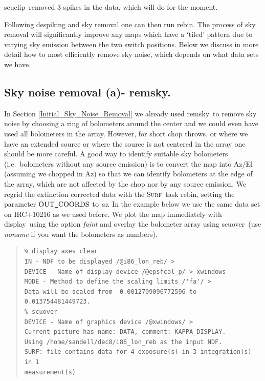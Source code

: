 \documentclass[twoside,11pt]{article}
\newenvironment{myquote}{\begin{quote}\begin{small}}{\end{small}\end{quote}}
\newcommand{\surf}{\xref{\textsc{Surf}}{sun216}{}}
\newcommand{\task}[1]{\textsf{#1}}
\newcommand{\rebin}{\xref{\task{rebin}}{sun216}{REBIN}}
\newcommand{\remsky}{\xref{\task{remsky}}{sun216}{REMSKY}}
\newcommand{\scuover}{\xref{\task{scuover}}{sun216}{SCUOVER}}
\newcommand{\scuclip}{\xref{\task{scuclip}}{sun216}{SCUCLIP}}
\newcommand{\display}{\xref{\task{display}}{sun95}{DISPLAY}}
\newcommand{\xref}[3]{#1}
\newcommand{\xlabel}[1]{}
\renewcommand{\_}{\texttt{\symbol{95}}}
\begin{document}
\scuclip\ removed 3 spikes in the data, which will do for the moment.



Following despiking and sky removal one can then run \rebin.  The
process of sky removal will significantly improve any maps which have
a `tiled' pattern due to varying sky emission between the two switch
positions.  Below we discuss in more detail how to most efficiently
remove sky noise, which depends on what data sets we have.

\subsection{\xlabel{Sky_Noise_Removal_remsky}Sky noise removal (a)-
\remsky.}

In Section \ref{Initial_Sky_Noise_Removal} we already used \remsky\ to
remove sky noise by choosing a ring of bolometers around the center
and we could even have used all bolometers in the array.  However, for
short chop throws, or where we have an extended source or where the
source is not centered in the array one should be more careful.  A
good way to identify suitable sky bolometers (i.e.\ bolometers without
any source emission) is to convert the map into Az/El (assuming we
chopped in Az) so that we can identify bolometers at the edge of the
array, which are not affected by the chop nor by any source emission.
We regrid the extinction corrected data with the \surf\ task
\rebin, setting the parameter $\rm OUT\_COORDS$ to {\it az}.  In the
example below we use the same data set on IRC$+$10216 as we used
before.  We plot the map immediately with \display\ using the option
{\it faint} and overlay the bolometer array using \scuover\ (use {\it
noname} if you want the bolometers as numbers).


\begin{myquote}
\begin{verbatim}
% display axes clear
IN - NDF to be displayed /@i86_lon_reb/ >
DEVICE - Name of display device /@epsfcol_p/ > xwindows
MODE - Method to define the scaling limits /'fa'/ >
Data will be scaled from -0.0012709096772596 to 0.013754481449723.
% scuover
DEVICE - Name of graphics device /@xwindows/ >
Current picture has name: DATA, comment: KAPPA_DISPLAY.
Using /home/sandell/dec8/i86_lon_reb as the input NDF.
SURF: file contains data for 4 exposure(s) in 3 integration(s) in 1
measurement(s)
\end{verbatim}
\end{myquote}
\end{document}
